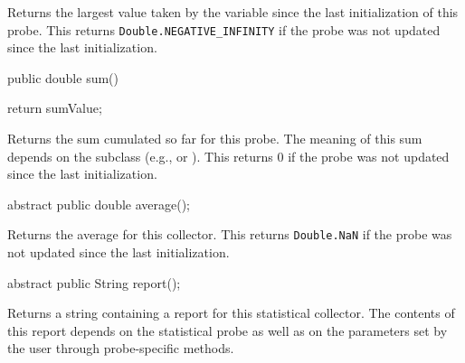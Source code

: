   \begin{tabb}  Returns the largest value taken by the variable 
   since the last initialization
   of this probe.
   This returns \texttt{Double.NEGATIVE\_INFINITY}
   if the probe was not updated since the last initialization.
 \end{tabb}
\begin{htmlonly}
\end{htmlonly}
\begin{code}

   public double sum() \begin{hide} { 
      return sumValue; 
   } \end{hide}
\end{code}
  \begin{tabb}  Returns the sum cumulated so far for this probe.
   The meaning of this sum depends on the subclass (e.g.,  or
   ).
   This returns 0
   if the probe was not updated since the last initialization.
 \end{tabb}
\begin{htmlonly}
\end{htmlonly}
\begin{code}

   abstract public double average();
\end{code}
  \begin{tabb}  Returns the average for this collector.
   This returns \texttt{Double.NaN}
   if the probe was not updated since the last initialization.
 \end{tabb}
\begin{htmlonly}
\end{htmlonly}
\begin{code}

   abstract public String report();
\end{code}
  \begin{tabb}  Returns a string containing a report for this statistical
   collector. The contents of this report depends on the statistical probe as
   well as on the parameters set by the user through probe-specific methods.
 \end{tabb}
\begin{htmlonly}
\end{htmlonly}
